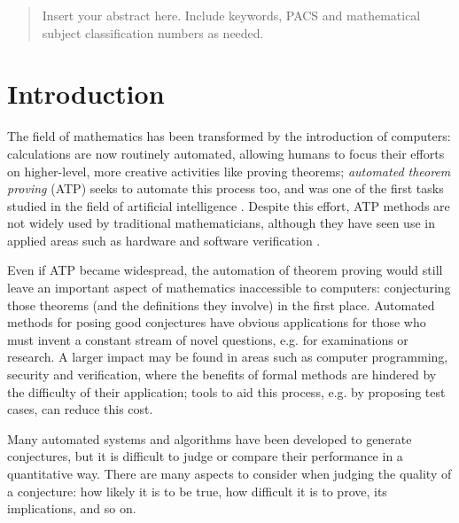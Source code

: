 \date{Received: date / Accepted: date}


\maketitle

\begin{abstract}
Insert your abstract here. Include keywords, PACS and mathematical
subject classification numbers as needed.
\end{abstract}

\section{Introduction}
\label{intro}
The field of mathematics has been transformed by the introduction of computers:
calculations are now routinely automated, allowing humans to focus their efforts
on higher-level, more creative activities like proving theorems; \emph{automated
theorem proving} (ATP) seeks to automate this process too, and was one of the
first tasks studied in the field of artificial intelligence
\cite{newell1956logic,sutcliffe2001evaluating}. Despite this effort, ATP
methods are not widely used by traditional mathematicians, although they have
seen use in applied areas such as hardware and software verification
\cite{Moore:2003}.

Even if ATP became widespread, the automation of theorem proving would still
leave an important aspect of mathematics inaccessible to computers: conjecturing
those theorems (and the definitions they involve) in the first place. Automated
methods for posing good conjectures have obvious applications for those who must
invent a constant stream of novel questions, e.g. for examinations or research.
A larger impact may be found in areas such as computer programming, security and
verification, where the benefits of formal methods are hindered by the
difficulty of their application; tools to aid this process, e.g. by proposing
test cases, can reduce this cost.

Many automated systems and algorithms have been developed to generate
conjectures, but it is difficult to judge or compare their performance in a
quantitative way. There are many aspects to consider when judging the quality of
a conjecture: how likely it is to be true, how difficult it is to prove, its
implications, and so on.

